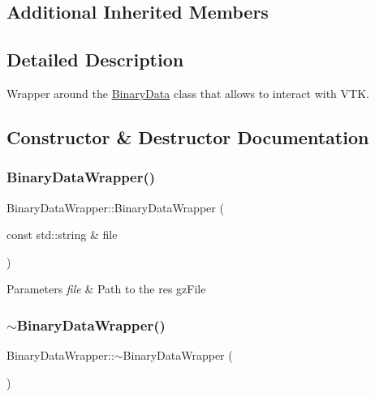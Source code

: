 \subsection*{Additional Inherited Members}


\subsection{Detailed Description}
Wrapper around the \hyperlink{classBinaryData}{Binary\+Data} class that allows to interact with V\+TK. 

\subsection{Constructor \& Destructor Documentation}
\mbox{\label{classBinaryDataWrapper_a3b8e761eca3c776aa55de4926e9eba8d}} 
\subsubsection{\texorpdfstring{Binary\+Data\+Wrapper()}{BinaryDataWrapper()}}
{\footnotesize\ttfamily Binary\+Data\+Wrapper\+::\+Binary\+Data\+Wrapper (\begin{DoxyParamCaption}\item[{const std\+::string \&}]{file }\end{DoxyParamCaption})}


\begin{DoxyParams}{Parameters}
{\em file} & Path to the res gz\+File \\
\hline
\end{DoxyParams}
\mbox{\label{classBinaryDataWrapper_aab9bf6a3b5a0a267b12bdf65bc44a5de}} 
\subsubsection{\texorpdfstring{$\sim$\+Binary\+Data\+Wrapper()}{~BinaryDataWrapper()}}
{\footnotesize\ttfamily Binary\+Data\+Wrapper\+::$\sim$\+Binary\+Data\+Wrapper (\begin{DoxyParamCaption}{ }\end{DoxyParamCaption})\hspace{0.3cm}{\ttfamily [default]}}



